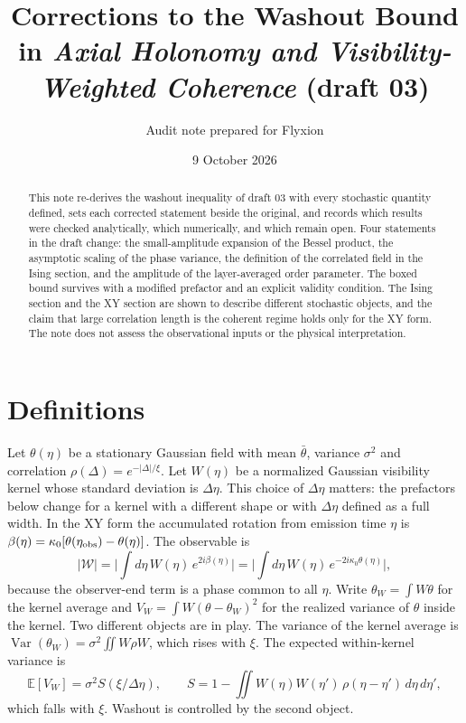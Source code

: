 \documentclass[11pt]{article}
\title{Corrections to the Washout Bound in \emph{Axial Holonomy and Visibility-Weighted Coherence} (draft 03)}
\author{Audit note prepared for Flyxion}
\date{9 October 2026}
\theoremstyle{remark}
\newcommand{\Wrec}{\Delta\eta}
\newcommand{\E}{\mathbb{E}}
\begin{document}
\maketitle

\begin{abstract}
This note re-derives the washout inequality of draft 03 with every stochastic quantity defined, sets each corrected statement beside the original, and records which results were checked analytically, which numerically, and which remain open. Four statements in the draft change: the small-amplitude expansion of the Bessel product, the asymptotic scaling of the phase variance, the definition of the correlated field in the Ising section, and the amplitude of the layer-averaged order parameter. The boxed bound survives with a modified prefactor and an explicit validity condition. The Ising section and the XY section are shown to describe different stochastic objects, and the claim that large correlation length is the coherent regime holds only for the XY form. The note does not assess the observational inputs or the physical interpretation.
\end{abstract}

\section{Definitions}

Let $\theta(\eta)$ be a stationary Gaussian field with mean $\bar\theta$, variance $\sigma^2$ and correlation $\rho(\Delta)=e^{-|\Delta|/\xi}$. Let $W(\eta)$ be a normalized Gaussian visibility kernel whose standard deviation is $\Wrec$. This choice of $\Wrec$ matters: the prefactors below change for a kernel with a different shape or with $\Wrec$ defined as a full width. In the XY form the accumulated rotation from emission time $\eta$ is $\beta(\eta)=\kappa_0[\theta(\eta_{\rm obs})-\theta(\eta)]$. The observable is
\[
|\mathcal W|=\Big|\int d\eta\,W(\eta)\,e^{2i\beta(\eta)}\Big|=\Big|\int d\eta\,W(\eta)\,e^{-2i\kappa_0\theta(\eta)}\Big|,
\]
because the observer-end term is a phase common to all $\eta$. Write $\theta_W=\int W\theta$ for the kernel average and $V_W=\int W(\theta-\theta_W)^2$ for the realized variance of $\theta$ inside the kernel. Two different objects are in play. The variance of the kernel average is $\operatorname{Var}(\theta_W)=\sigma^2\iint W\rho W$, which rises with $\xi$. The expected within-kernel variance is
\[
\E[V_W]=\sigma^2 S(\xi/\Wrec),\qquad S=1-\iint W(\eta)W(\eta')\,\rho(\eta-\eta')\,d\eta\,d\eta',
\]
which falls with $\xi$. Washout is controlled by the second object.
\end{document}
